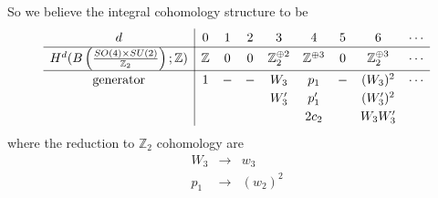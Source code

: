 \documentclass[12pt]{article}
\numberwithin{equation}{section}
\def\bZ{\mathbb{Z}}
\begin{document}
So we believe the integral cohomology structure to be
\begin{equation}
	\label{case1}
	\renewcommand{\arraystretch}{1.2}
	\begin{array}{c|cccccccccccccccc}
		d & 0 & 1 & 2 & 3 & 4 & 5 & 6 & \cdots \\
		\hline
		H^d(B\left(\tfrac{SO(4)\times SU(2)}{\bZ_2}\right);\bZ) & \bZ & 0 & 0 & \bZ_2^{\oplus 2} & \bZ^{\oplus 3} & 0 & \bZ_2^{\oplus 3} & \cdots\\
		\hline
		\text{generator} & 1 & - & - & W_3 & p_1 & - & (W_3)^2 & \cdots\\
		&&&& W'_3 & p'_1 && (W'_3)^2\\
		&&&&& 2c_2 && W_3W'_3
	\end{array}
\end{equation}
where the reduction to $\bZ_2$ cohomology are
\begin{equation}
	\begin{array}{ccc}
		W_3 & \to & w_3\\
		p_1 & \to & (w_2)^2\\
	\end{array}
\end{equation}
\end{document}
